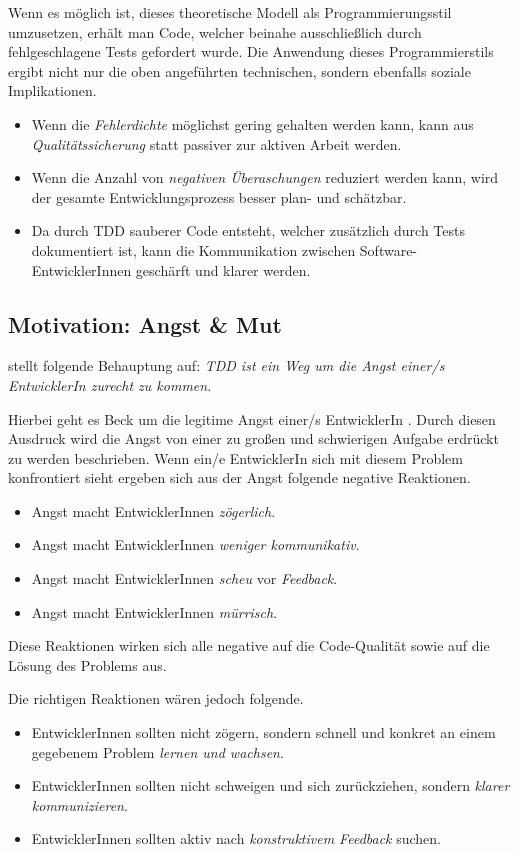 Wenn es möglich ist, dieses theoretische Modell als Programmierungsstil umzusetzen, erhält man Code, welcher beinahe ausschließlich durch fehlgeschlagene Tests gefordert wurde. Die Anwendung dieses Programmierstils ergibt nicht nur die oben angeführten technischen, sondern ebenfalls soziale Implikationen.
\begin{itemize}
  \item Wenn die \textit{Fehlerdichte} möglichst gering gehalten werden kann, kann aus \textit{Qualitätssicherung} statt passiver zur aktiven Arbeit werden.
  \item Wenn die Anzahl von \textit{negativen Überaschungen} reduziert werden kann, wird der gesamte Entwicklungsprozess besser plan- und schätzbar.
  \item Da durch TDD sauberer Code entsteht, welcher zusätzlich durch Tests dokumentiert ist, kann die Kommunikation zwischen Software-EntwicklerInnen geschärft und klarer werden.
\end{itemize}

\subsection{Motivation: Angst {\&} Mut}
\cite{Beck:2003} stellt folgende Behauptung auf: \newline
\textit{TDD ist ein Weg um die Angst einer/s EntwicklerIn zurecht zu kommen}.

Hierbei geht es Beck um die legitime Angst einer/s EntwicklerIn . Durch diesen Ausdruck wird die Angst von einer zu großen und schwierigen Aufgabe erdrückt zu werden beschrieben.
Wenn ein/e EntwicklerIn sich mit diesem Problem konfrontiert sieht ergeben sich aus der Angst folgende negative Reaktionen.
\begin{itemize}
  \item Angst macht EntwicklerInnen \textit{zögerlich}.
  \item Angst macht EntwicklerInnen \textit{weniger kommunikativ}.
  \item Angst macht EntwicklerInnen \textit{scheu} vor \textit{Feedback}.
  \item Angst macht EntwicklerInnen \textit{mürrisch}.
\end{itemize}
Diese Reaktionen wirken sich alle negative auf die Code-Qualität sowie auf die Lösung des Problems aus.

Die richtigen Reaktionen wären jedoch folgende.
\begin{itemize}
  \item EntwicklerInnen sollten nicht zögern, sondern schnell und konkret an einem gegebenem Problem \textit{lernen und wachsen}.
  \item EntwicklerInnen sollten nicht schweigen und sich zurückziehen, sondern \textit{klarer kommunizieren}.
  \item EntwicklerInnen sollten aktiv nach \textit{konstruktivem Feedback} suchen.
\end{itemize}

